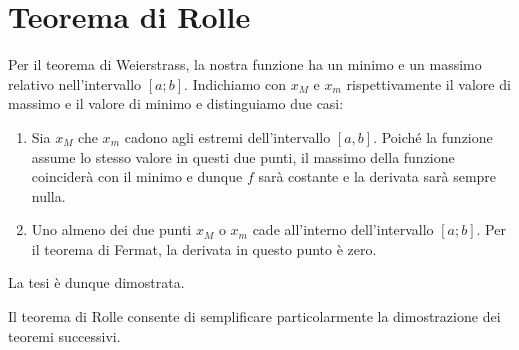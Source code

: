 \documentclass{report}
\begin{document}
\section{Teorema di Rolle}
\begin{myproof}
Per il teorema di Weierstrass, la nostra funzione ha un minimo e un massimo relativo nell'intervallo $[a;b]$. Indichiamo con $x_M$ e $x_m$ rispettivamente il valore di massimo e il valore di minimo e distinguiamo due casi:
\begin{enumerate}[label=\protect\circled{\arabic*}]
	\item Sia $x_M$ che $x_m$ cadono agli estremi dell'intervallo $[a,b]$. Poiché la 				funzione assume lo stesso valore in questi due punti, il massimo della funzione 				coinciderà con il minimo e dunque $f$ sarà costante e la derivata sarà sempre nulla.
	\item Uno almeno dei due punti $x_M$ o $x_m$ cade all'interno dell'intervallo $[a;b]$. 	Per il teorema di Fermat, la derivata in questo punto è zero.
\end{enumerate}
La tesi è dunque dimostrata.
\end{myproof}
\par\smallskip\noindent Il teorema di Rolle consente di semplificare particolarmente la dimostrazione dei teoremi successivi.
\end{document}
